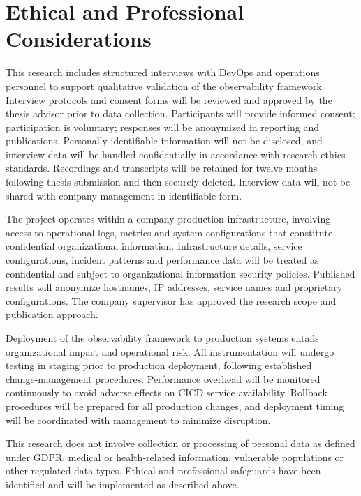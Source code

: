 \documentclass[12pt]{article}
\begin{document}
\section{Ethical and Professional Considerations}

This research includes structured interviews with DevOps and operations personnel to support qualitative validation of the observability framework. Interview protocols and consent forms will be reviewed and approved by the thesis advisor prior to data collection. Participants will provide informed consent; participation is voluntary; responses will be anonymized in reporting and publications. Personally identifiable information will not be disclosed, and interview data will be handled confidentially in accordance with research ethics standards. Recordings and transcripts will be retained for twelve months following thesis submission and then securely deleted. Interview data will not be shared with company management in identifiable form.

The project operates within a company production infrastructure, involving access to operational logs, metrics and system configurations that constitute confidential organizational information. Infrastructure details, service configurations, incident patterns and performance data will be treated as confidential and subject to organizational information security policies. Published results will anonymize hostnames, \ac{IP} addresses, service names and proprietary configurations. The company supervisor has approved the research scope and publication approach.

Deployment of the observability framework to production systems entails organizational impact and operational risk. All instrumentation will undergo testing in staging prior to production deployment, following established change‑management procedures. Performance overhead will be monitored continuously to avoid adverse effects on \ac{CICD} service availability. Rollback procedures will be prepared for all production changes, and deployment timing will be coordinated with management to minimize disruption.

This research does not involve collection or processing of personal data as defined under \ac{GDPR}, medical or health‑related information, vulnerable populations or other regulated data types. Ethical and professional safeguards have been identified and will be implemented as described above.



\end{document}
